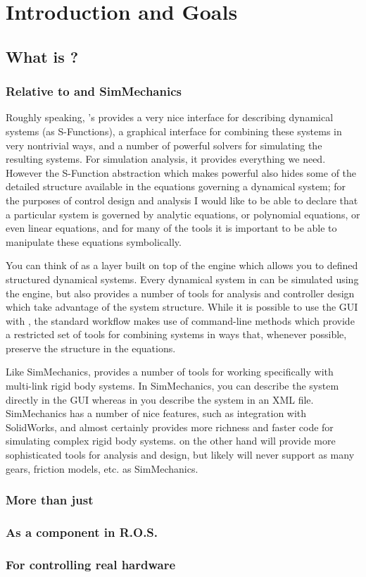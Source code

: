 \chapter{Introduction and Goals}



\section{What is \robotlib?}

\subsection{Relative to \simulink and SimMechanics}

Roughly speaking, \matlab's \simunlink provides a very nice interface for describing dynamical systems (as S-Functions), a graphical interface for combining these systems in very nontrivial ways, and a number of powerful solvers for simulating the resulting systems.  For simulation analysis, it provides everything we need.   However the S-Function abstraction which makes \simulink powerful also hides some of the detailed structure available in the equations governing a dynamical system; for the purposes of control design and analysis I would like to be able to declare that a particular system is governed by analytic equations, or polynomial equations, or even linear equations, and for many of the tools it is important to be able to manipulate these equations symbolically.   

You can think of \robotlib as a layer built on top of the \simulink engine which allows you to defined structured dynamical systems.  Every dynamical system in \robotlib can be simulated using the \simulink engine, but \robotlib also provides a number of tools for analysis and controller design which take advantage of the system structure.  While it is possible to use the \simulink GUI with \robotlib, the standard workflow makes use of command-line methods which provide a restricted set of tools for combining systems in ways that, whenever possible, preserve the structure in the equations.  

Like SimMechanics, \robotlib provides a number of tools for working specifically with multi-link rigid body systems.  In SimMechanics, you can describe the system directly in the GUI whereas in \robotlib you describe the system in an XML file.  SimMechanics has a number of nice features, such as integration with SolidWorks, and almost certainly provides more richness and faster code for simulating complex rigid body systems.  \robotlib on the other hand will provide more sophisticated tools for analysis and design, but likely will never support as many gears, friction models, etc. as SimMechanics.  

\subsection{More than just \matlab}

\subsection{As a component in R.O.S.}

\subsection{For controlling real hardware}

